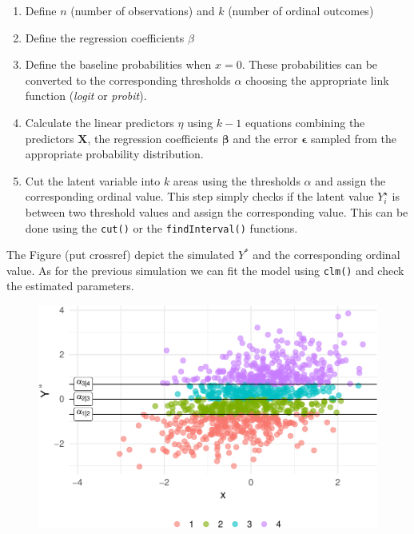 \documentclass[
  man,floatsintext]{apa6}
\providecommand{\tightlist}{%
  \setlength{\itemsep}{0pt}\setlength{\parskip}{0pt}}
\begin{document}
\begin{enumerate}
\def\labelenumi{\arabic{enumi}.}
\tightlist
\item
  Define \(n\) (number of observations) and \(k\) (number of ordinal outcomes)
\item
  Define the regression coefficients \(\beta\)
\item
  Define the baseline probabilities when \(x = 0\). These probabilities can be converted to the corresponding thresholds \(\alpha\) choosing the appropriate link function (\emph{logit} or \emph{probit}).
\item
  Calculate the linear predictors \(\eta\) using \(k - 1\) equations combining the predictors \(\mathbf{X}\), the regression coefficients \(\mathbf{\beta}\) and the error \(\mathbf{\epsilon}\) sampled from the appropriate probability distribution.
\item
  Cut the latent variable into \(k\) areas using the thresholds \(\alpha\) and assign the corresponding ordinal value. This step simply checks if the latent value \(Y^{\star}_i\) is between two threshold values and assign the corresponding value. This can be done using the \texttt{cut()} or the \texttt{findInterval()} functions.
\end{enumerate}

The Figure (put crossref) depict the simulated \(Y^{*}\) and the corresponding ordinal value. As for the previous simulation we can fit the model using \texttt{clm()} and check the estimated parameters.

\begin{figure}

{\centering \includegraphics{paper-new_files/figure-latex/unnamed-chunk-17-1} 

}

\caption{ }\label{fig:unnamed-chunk-17}
\end{figure}
\end{document}
